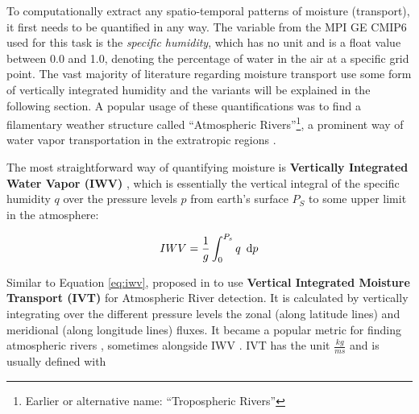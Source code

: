 To computationally extract any spatio-temporal patterns of moisture (transport), it first needs to be quantified in any way.
The variable from the MPI GE CMIP6 used for this task is the \textit{specific humidity}, which has no unit and is a float value between 0.0 and 1.0, denoting the percentage of water in the air at a specific grid point. 
The vast majority of literature regarding moisture transport use some form of vertically integrated humidity and the variants will be explained in the following section.  
A popular usage of these quantifications was to find a filamentary weather structure called \enquote{Atmospheric Rivers}\footnote{Earlier or alternative name: \enquote{Tropospheric Rivers}}, a prominent way of water vapor transportation in the extratropic regions \cite{gimeno_atmospheric_2014}. 


The most straightforward way of quantifying moisture is \textbf{Vertically Integrated Water Vapor (IWV)} \cite{gimeno_atmospheric_2014, schluessel_atmospheric_1990, bao_interpretation_2006, neiman_meteorological_2008, zhao_lagrangian_2021}, which is essentially the vertical integral of the specific humidity $q$ over the pressure levels $p$ from earth's surface $P_S$ to some upper limit in the atmosphere:


\begin{equation}
\label{eq:iwv}
IWV = \frac{1}{g} \int^{P_s}_0 q ~\operatorname{d}\!{p}
\end{equation}






Similar to Equation \ref{eq:iwv},  \citeauthor{zhu_proposed_1998} proposed in \cite{zhu_proposed_1998} to use \textbf{Vertical Integrated Moisture Transport (IVT)} for Atmospheric River detection. 
It is calculated by vertically integrating over the different pressure levels the zonal (along latitude lines) and meridional (along longitude lines) fluxes.
It became a popular metric for finding atmospheric rivers \cite{gimeno_atmospheric_2014}, sometimes alongside IWV \cite{eiras-barca_seasonal_2016}.
IVT has the unit $\frac{kg}{ms}$ and is usually defined with

